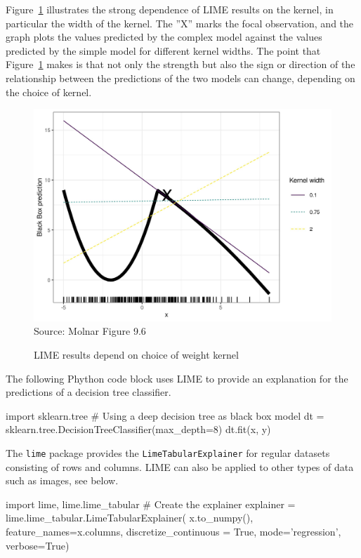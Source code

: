 Figure~\ref{fig:molnar96} illustrates the strong dependence of LIME results on the kernel, in particular the width of the kernel. The ''X'' marks the focal observation, and the graph plots the values predicted by the complex model against the values predicted by the simple model for different kernel widths. The point that Figure~\ref{fig:molnar96} makes is that not only the strength but also the sign or direction of the relationship between the predictions of the two models can change, depending on the choice of kernel. 

\begin{figure}
\centering

\includegraphics[width=.75\textwidth]{molnar-9-6.jpeg} \\

\scriptsize Source: Molnar Figure 9.6
\caption{LIME results depend on choice of weight kernel}
\label{fig:molnar96}
\end{figure}

The following Phython code block uses LIME to provide an explanation for the predictions of a decision tree classifier. 

\begin{samepage}
\begin{pythoncode}
import sklearn.tree
# Using a deep decision tree as black box model
dt = sklearn.tree.DecisionTreeClassifier(max_depth=8)
dt.fit(x, y)
\end{pythoncode}
\end{samepage}

The \texttt{lime} package provides the \texttt{LimeTabularExplainer} for regular datasets consisting of rows and columns. LIME can also be applied to other types of data such as images, see below.

\begin{samepage}
\begin{pythoncode}
import lime, lime.lime_tabular
# Create the explainer
explainer = lime.lime_tabular.LimeTabularExplainer(
    x.to_numpy(), 
    feature_names=x.columns, 
    discretize_continuous = True, 
    mode='regression', 
    verbose=True)
\end{pythoncode}
\end{samepage}


